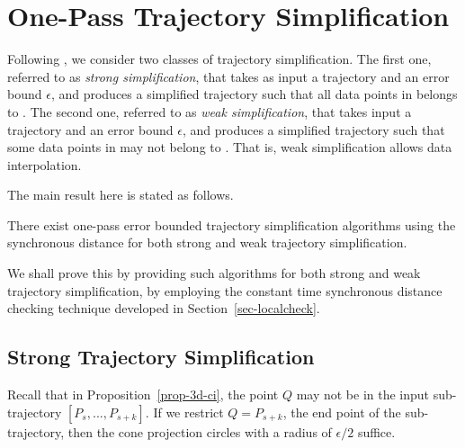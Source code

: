 \section{One-Pass Trajectory Simplification}
\label{sec-alg}

Following \cite{Trajcevski:DDR,Lin:Operb}, we consider two classes of trajectory simplification.
The first one, referred to as \emph{strong simplification}, that takes as input a trajectory  and an error bound $\epsilon$, and produces
a simplified trajectory  such that all data points in  belongs to .
The second one, referred to as \emph{weak simplification}, that takes input a trajectory  and an error bound $\epsilon$, and produces
a simplified trajectory  such that some data points in  may not belong to . That is,  weak simplification allows data interpolation. %


The main result here is stated as follows.

\begin{theorem}
\label{prop-cist-complexity}
There exist one-pass error bounded trajectory simplification algorithms using the synchronous distance for both strong and weak trajectory simplification.
\end{theorem}

We shall prove this by providing such algorithms for both strong and weak trajectory simplification, by employing the constant time synchronous distance checking technique developed in Section~\ref{sec-localcheck}.

\subsection{Strong Trajectory Simplification}
Recall that in Proposition~\ref{prop-3d-ci}, the point $Q$ may not be in the input sub-trajectory $[P_s,...,P_{s+k}]$.
If we restrict $Q=P_{s+k}$, the end point of the sub-trajectory, then the cone projection circles with a radius of $\epsilon/2$ suffice.

